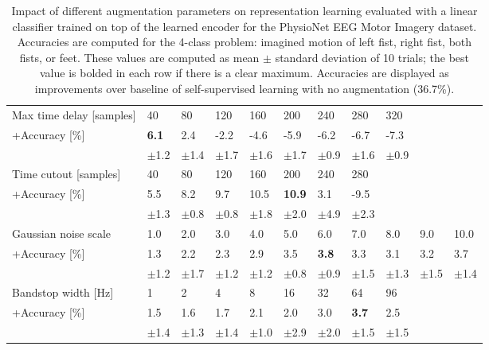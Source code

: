 \documentclass{article}
\newcommand{\std}[1]{{\scriptsize{$\pm$#1}}}
\begin{document}
\begin{table}
  \centering
  \caption{Impact of different augmentation parameters on representation
  learning evaluated with a linear classifier trained on top of the learned
  encoder for the PhysioNet EEG Motor Imagery dataset. Accuracies are computed
  for the 4-class problem: imagined motion of left fist, right fist, both fists,
  or feet. These values are computed as mean $\pm$ standard deviation of 10
  trials; the best value is bolded in each row if there is a clear maximum.
  Accuracies are displayed as improvements over baseline of self-supervised
  learning with no augmentation (36.7\%).}
  \label{table:eeg:augmentations}
  \small
  \begin{tabular}{l|llllllllll}
\toprule
Max time delay [samples]
    & 40 & 80 & 120 & 160 & 200 & 240 & 280 & 320 \\
    \hspace{5pt}+Accuracy [\%]
    & \textbf{6.1} & 2.4 & -2.2 & -4.6 & -5.9 & -6.2 & -6.7 & -7.3 \\
    & \std{1.2} & \std{1.4} & \std{1.7} & \std{1.6} & \std{1.7} & \std{0.9} & \std{1.6} & \std{0.9} \\
    \midrule

Time cutout [samples] & 40 & 80 & 120 & 160 & 200 & 240 & 280 \\
    \hspace{5pt}+Accuracy [\%]
    & 5.5 & 8.2 & 9.7 & 10.5 & \textbf{10.9} & 3.1 & -9.5 \\
    & \std{1.3} & \std{0.8} & \std{0.8} & \std{1.8} & \std{2.0} & \std{4.9} & \std{2.3} \\
    \midrule

Gaussian noise scale
    & 1.0 & 2.0 & 3.0 & 4.0 & 5.0 & 6.0 & 7.0 & 8.0 & 9.0 & 10.0 \\
    \hspace{5pt}+Accuracy [\%]
    & 1.3 & 2.2 & 2.3 & 2.9 & 3.5 & \textbf{3.8} & 3.3 & 3.1 & 3.2 & 3.7 \\
    & \std{1.2} & \std{1.7} & \std{1.2} & \std{1.2} & \std{0.8} & \std{0.9} & \std{1.5} & \std{1.3} & \std{1.5} & \std{1.4} \\
    \midrule

Bandstop width [Hz]
    & 1 & 2 & 4 & 8 & 16 & 32 & 64 & 96 \\
    \hspace{5pt}+Accuracy [\%]
    & 1.5 & 1.6 & 1.7 & 2.1 & 2.0 & 3.0 & \textbf{3.7} & 2.5 \\
    & \std{1.4} & \std{1.3} & \std{1.4} & \std{1.0} & \std{2.9} & \std{2.0} & \std{1.5} & \std{1.5} \\


\end{tabular}
\end{table}
\end{document}
